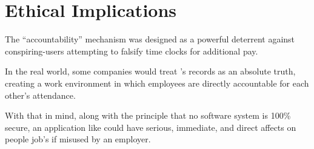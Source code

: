 \section{Ethical Implications}

The \enquote{accountability} mechanism was designed as a
powerful deterrent against \gls{conspiring-users}
attempting to falsify time clocks for additional pay.

In the real world, some companies would treat
\projectname{}'s records as an absolute truth, creating a
work environment in which employees are directly
accountable for each other's attendance.

With that in mind, along with the principle that no
software system is 100\% secure, an application like 
\projectname{} could have serious, immediate, and direct
affects on people job's if misused by an employer. 
